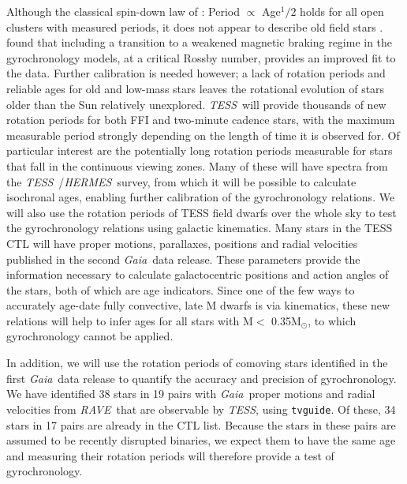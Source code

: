 \documentclass[useAMS, usenatbib, preprint, 12pt]{aastex}
\newcommand{\Kepler}{{\it Kepler}}
\newcommand{\kepler}{\Kepler}
\newcommand{\TESS}{{\it TESS}}
\newcommand{\Gaia}{{\it Gaia}}
\newcommand{\RAVE}{{\it RAVE}}
\newcommand{\HERMES}{{\it HERMES}}
\begin{document}
Although the classical spin-down law of \citet{skumanich1972}: Period
$\propto$ Age$^1/2$ holds for all open clusters with measured periods, it does
not appear to describe old field stars \citep{angus2015, van-saders2016}.
\citet{van-saders2016} found that including a transition to a weakened magnetic
braking regime in the gyrochronology models, at a critical Rossby number,
provides an improved fit to the data.
Further calibration is needed however; a lack of rotation periods and reliable
ages for old and low-mass stars leaves the rotational evolution of stars older
than the Sun relatively unexplored.
\TESS\ will provide thousands of new rotation periods for both FFI and
two-minute cadence stars, with the maximum measurable period strongly
depending on the length of time it is observed for.
Of particular interest are the potentially long rotation periods measurable
for stars that fall in the continuous viewing zones.
Many of these will have spectra from the \TESS\ /\HERMES\ survey, from which it
will be possible to calculate isochronal ages, enabling further calibration of
the gyrochronology relations.
We will also use the rotation periods of TESS field dwarfs over the whole sky
to test the gyrochronology relations using galactic kinematics.
Many stars in the TESS CTL will have proper motions, parallaxes, positions and
radial velocities published in the second \Gaia\ data release.
These parameters provide the information necessary to calculate galactocentric
positions and action angles of the stars, both of which are age indicators.
Since one of the few ways to accurately age-date fully convective, late M
dwarfs is via kinematics, these new relations will help to infer ages for all
stars with M$<$ 0.35M$_\odot$, to which gyrochronology cannot be applied.

In addition, we will use the rotation periods of comoving stars identified in
the first \Gaia\ data release \citep{oh2016} to quantify the accuracy and
precision of gyrochronology.
We have identified 38 stars in 19 pairs with \Gaia\ proper motions and radial
velocities from \RAVE\ that are observable by \TESS, using {\tt tvguide}.
Of these, 34 stars in 17 pairs are already in the CTL list.
Because the stars in these pairs are assumed to be recently disrupted
binaries, we expect them to have the same age and measuring their rotation
periods will therefore provide a test of gyrochronology.
\end{document}
